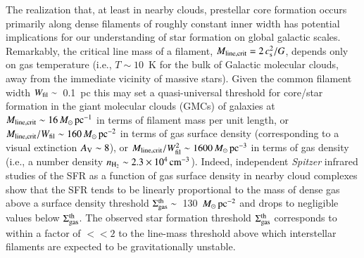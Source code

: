 \documentclass{aa}
\begin{document}
The realization that, at least in nearby clouds,  
prestellar core formation occurs primarily along dense filaments of roughly constant inner width 
has potential implications for our understanding of star formation on global galactic scales. 
Remarkably, the critical line mass   
of a filament, $M_{\rm line, crit} = 2\, c_{\rm s}^2/G$, depends only on gas temperature 
(i.e., $T \sim 10$~K for the bulk of Galactic molecular clouds, away from the immediate vicinity of massive stars). 
Given the common filament width $W_{\rm fil} \sim $~0.1~pc \citep[][]{Arzoumanian11}
this may set a quasi-universal threshold for core/star formation in the giant molecular clouds (GMCs) 
of galaxies at 
$M_{\rm line, crit} \sim 16\, M_\odot \, {\rm pc}^{-1} $ 
in terms of filament mass per unit length, or $M_{\rm line, crit}/W_{\rm fil} \sim 160\, M_\odot \, {\rm pc}^{-2} $ in terms of gas surface 
density (corresponding to a visual extinction $A_{\rm V} \sim 8$), 
or $M_{\rm line, crit}/W_{\rm fil}^2 \sim 1600\, M_\odot \, {\rm pc}^{-3} $ in terms of gas density 
(i.e., a number density $n_{\rm H_2} \sim 2.3 \times 10^4\, {\rm cm}^{-3} $). 
Indeed,  independent {\it Spitzer} infrared studies of the SFR as a function of gas surface density in nearby cloud complexes 
\citep[e.g.][]{Heiderman10,Lada10,Evans14} show that the SFR tends to be linearly proportional to the 
mass of dense gas above a surface density threshold $\Sigma_{\rm gas}^{\rm th} \sim $~130~$M_\odot \, {\rm pc}^{-2} $ 
and drops to negligible values below $\Sigma_{\rm gas}^{\rm th} $. 
The observed star formation threshold $\Sigma_{\rm gas}^{\rm th} $ corresponds to within a factor of $<< 2$ to the 
line-mass threshold above which interstellar filaments are expected to be gravitationally unstable. 


\end{document}
